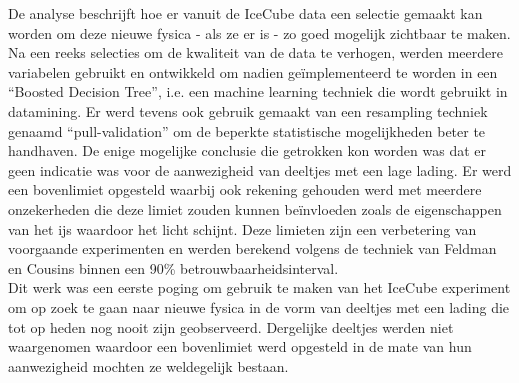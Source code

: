 \noindent De analyse beschrijft hoe er vanuit de IceCube data een selectie gemaakt kan worden om deze nieuwe fysica - als ze er is - zo goed mogelijk zichtbaar te maken. Na een reeks selecties om de kwaliteit van de data te verhogen, werden meerdere variabelen gebruikt en ontwikkeld om nadien ge\"implementeerd te worden in een ``Boosted Decision Tree'', i.e. een machine learning techniek die wordt gebruikt in datamining. Er werd tevens ook gebruik gemaakt van een resampling techniek genaamd ``pull-validation'' om de beperkte statistische mogelijkheden beter te handhaven. De enige mogelijke conclusie die getrokken kon worden was dat er geen indicatie was voor de aanwezigheid van deeltjes met een lage lading. Er werd een bovenlimiet opgesteld waarbij ook rekening gehouden werd met meerdere onzekerheden die deze limiet zouden kunnen be\"invloeden zoals de eigenschappen van het ijs waardoor het licht schijnt. Deze limieten zijn een verbetering van voorgaande experimenten en werden berekend volgens de techniek van Feldman en Cousins binnen een 90\% betrouwbaarheidsinterval.\\

\noindent Dit werk was een eerste poging om gebruik te maken van het IceCube experiment om op zoek te gaan naar nieuwe fysica in de vorm van deeltjes met een lading die tot op heden nog nooit zijn geobserveerd. Dergelijke deeltjes werden niet waargenomen waardoor een bovenlimiet werd opgesteld in de mate van hun aanwezigheid mochten ze weldegelijk bestaan.
